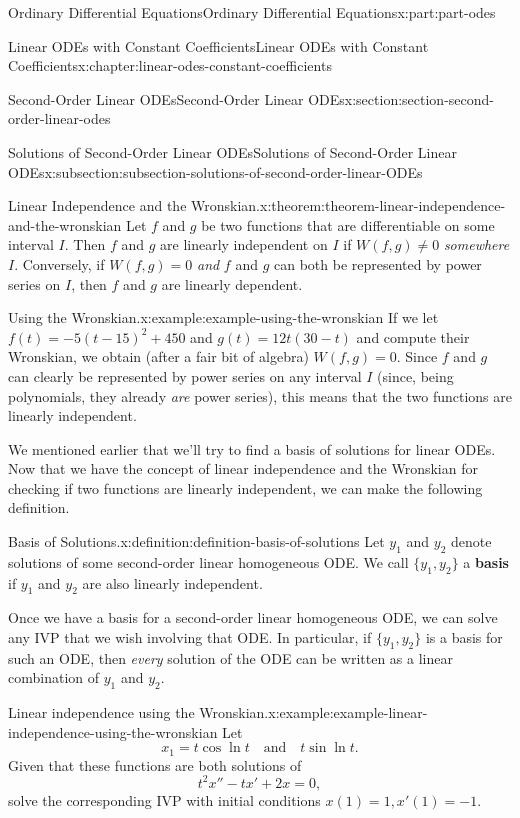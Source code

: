 \documentclass[twoside,10pt,]{book}
\newcommand{\terminology}[1]{\textbf{#1}}
\numberwithin{equation}{part}
\begin{document}
\begin{partptx}{Ordinary Differential Equations}{}{Ordinary Differential Equations}{}{}{x:part:part-odes}
\begin{chapterptx}{Linear ODEs with Constant Coefficients}{}{Linear ODEs with Constant Coefficients}{}{}{x:chapter:linear-odes-constant-coefficients}
\begin{sectionptx}{Second-Order Linear ODEs}{}{Second-Order Linear ODEs}{}{}{x:section:section-second-order-linear-odes}
\begin{subsectionptx}{Solutions of Second-Order Linear ODEs}{}{Solutions of Second-Order Linear ODEs}{}{}{x:subsection:subsection-solutions-of-second-order-linear-ODEs}
\begin{theorem}{Linear Independence and the Wronskian.}{}{x:theorem:theorem-linear-independence-and-the-wronskian}
Let \(f\) and \(g\) be two functions that are differentiable on some interval \(I\). Then \(f\) and \(g\) are linearly independent on \(I\) if \(W(f,g) \neq 0\) \emph{somewhere} \(I\). Conversely, if \(W(f,g) = 0\) \emph{and} \(f\) and \(g\) can both be represented by power series on \(I\), then \(f\) and \(g\) are linearly dependent.%
\end{theorem}
\begin{example}{Using the Wronskian.}{x:example:example-using-the-wronskian}%
If we let \(f(t) = -5(t-15)^{2} + 450\) and \(g(t) = 12t(30-t)\) and compute their Wronskian, we obtain (after a fair bit of algebra) \(W(f,g) = 0\). Since \(f\) and \(g\) can clearly be represented by power series on any interval \(I\) (since, being polynomials, they already \emph{are} power series), this means that the two functions are linearly independent.%
\end{example}
We mentioned earlier that we'll try to find a basis of solutions for linear ODEs. Now that we have the concept of linear independence and the Wronskian for checking if two functions are linearly independent, we can make the following definition.%
\begin{definition}{Basis of Solutions.}{x:definition:definition-basis-of-solutions}%
%
Let \(y_{1}\) and \(y_{2}\) denote solutions of some second-order linear homogeneous ODE. We call \(\{y_{1},y_{2}\}\) a \terminology{basis} if \(y_{1}\) and \(y_{2}\) are also linearly independent.%
\end{definition}
Once we have a basis for a second-order linear homogeneous ODE, we can solve any IVP that we wish involving that ODE. In particular, if \(\{y_{1},y_{2}\}\) is a basis for such an ODE, then \emph{every} solution of the ODE can be written as a linear combination of \(y_{1}\) and \(y_{2}\).%
\begin{example}{Linear independence using the Wronskian.}{x:example:example-linear-independence-using-the-wronskian}%
Let%
\begin{equation*}
x_{1} = t\cos\ln t\quad\text{and}\quad t\sin\ln t.
\end{equation*}
Given that these functions are both solutions of%
\begin{equation*}
t^{2}x'' - tx' + 2x = 0,
\end{equation*}
solve the corresponding IVP with initial conditions \(x(1) = 1, x'(1) = -1\).%
\par\smallskip%

\end{example}
\end{subsectionptx}
\end{sectionptx}
\end{chapterptx}
\end{partptx}
\end{document}
